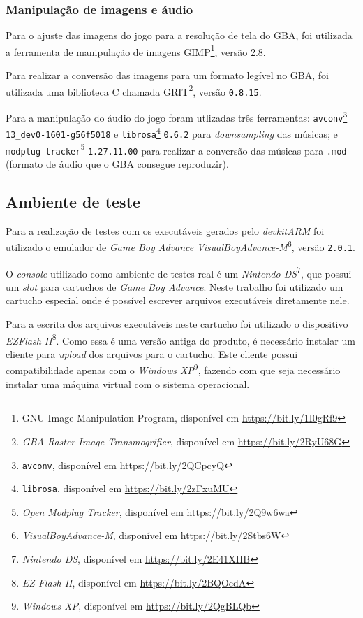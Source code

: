     \subsubsection{Manipulação de imagens e áudio}

      Para o ajuste das imagens do jogo para a resolução de tela do GBA, foi utilizada a ferramenta de manipulação de imagens GIMP\footnote{GNU Image Manipulation Program, disponível em \url{https://bit.ly/1I0gRf9}}, versão 2.8.

      Para realizar a conversão das imagens para um formato legível no GBA, foi utilizada uma biblioteca C chamada GRIT\footnote{\textit{GBA Raster Image Transmogrifier}, disponível em \url{https://bit.ly/2RyU68G}}, versão \texttt{0.8.15}.

      Para a manipulação do áudio do jogo foram utlizadas três ferramentas: \texttt{avconv}\footnote{\texttt{avconv}, disponível em \url{https://bit.ly/2QCpcyQ}} \texttt{13\_dev0-1601-g56f5018} e \texttt{librosa}\footnote{\texttt{librosa}, disponível em \url{https://bit.ly/2zFxuMU}} \texttt{0.6.2} para \textit{downsampling} das músicas; e \texttt{modplug tracker}\footnote{\textit{Open Modplug Tracker}, disponível em \url{https://bit.ly/2Q9w6wa}} \texttt{1.27.11.00} para realizar a conversão das músicas para \texttt{.mod} (formato de áudio que o GBA consegue reproduzir).

  \subsection{Ambiente de teste}

      Para a realização de testes com os executáveis gerados pelo \textit{devkitARM} foi utilizado o emulador de \textit{Game Boy Advance} \textit{VisualBoyAdvance-M}\footnote{\textit{VisualBoyAdvance-M}, disponível em \url{https://bit.ly/2Stbs6W}}, versão \texttt{2.0.1}.

      O \textit {console} utilizado como ambiente de testes real é um \textit{Nintendo DS}\footnote{\textit{Nintendo DS}, disponível em \url{https://bit.ly/2E41XHB}}, que possui um \textit{slot} para cartuchos de \textit{Game Boy Advance}. Neste trabalho foi utilizado um cartucho especial onde é possível escrever arquivos executáveis diretamente nele.

      Para a escrita dos arquivos executáveis neste cartucho foi utilizado o dispositivo \textit{EZFlash II}\footnote{\textit{EZ Flash II}, disponível em \url{https://bit.ly/2BQOcdA}}. Como essa é uma versão antiga do produto, é necessário instalar um cliente para \textit{upload} dos arquivos para o cartucho. Este cliente possui compatibilidade apenas com o \textit{Windows XP}\footnote{\textit{Windows XP}, disponível em \url{https://bit.ly/2QgBLQb}}, fazendo com que seja necessário instalar uma máquina virtual com o sistema operacional.

